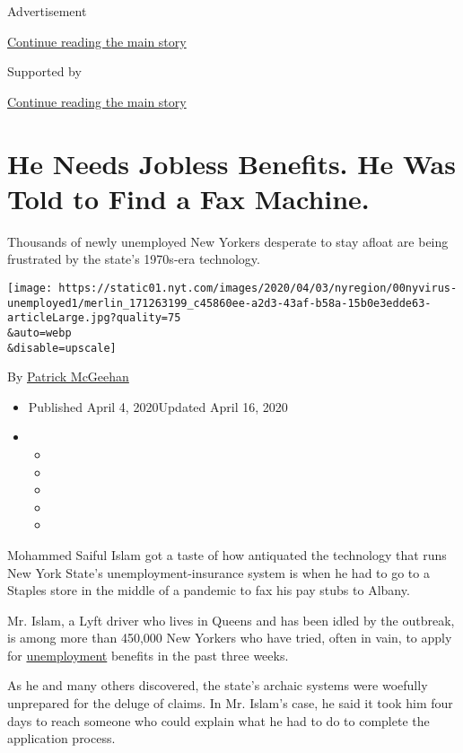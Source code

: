 Advertisement

\protect\hyperlink{after-top}{Continue reading the main story}

Supported by

\protect\hyperlink{after-sponsor}{Continue reading the main story}

\hypertarget{he-needs-jobless-benefits-he-was-told-to-find-a-fax-machine}{%
\section{He Needs Jobless Benefits. He Was Told to Find a Fax
Machine.}\label{he-needs-jobless-benefits-he-was-told-to-find-a-fax-machine}}

Thousands of newly unemployed New Yorkers desperate to stay afloat are
being frustrated by the state's 1970s-era technology.

\texttt{[image: https://static01.nyt.com/images/2020/04/03/nyregion/00nyvirus-unemployed1/merlin\_171263199\_c45860ee-a2d3-43af-b58a-15b0e3edde63-articleLarge.jpg?quality=75\\\&auto=webp\\\&disable=upscale]}

By \href{https://www.nytimes.com/by/patrick-mcgeehan}{Patrick McGeehan}

\begin{itemize}
\item
  Published April 4, 2020Updated April 16, 2020
\item
  \begin{itemize}
  \item
  \item
  \item
  \item
  \item
  \end{itemize}
\end{itemize}

Mohammed Saiful Islam got a taste of how antiquated the technology that
runs New York State's unemployment-insurance system is when he had to go
to a Staples store in the middle of a pandemic to fax his pay stubs to
Albany.

Mr. Islam, a Lyft driver who lives in Queens and has been idled by the
outbreak, is among more than 450,000 New Yorkers who have tried, often
in vain, to apply for
\href{https://www.nytimes.com/2020/04/16/us/california-unemployment-edd-coronavirus.html}{unemployment}
benefits in the past three weeks.

As he and many others discovered, the state's archaic systems were
woefully unprepared for the deluge of claims. In Mr. Islam's case, he
said it took him four days to reach someone who could explain what he
had to do to complete the application process.

